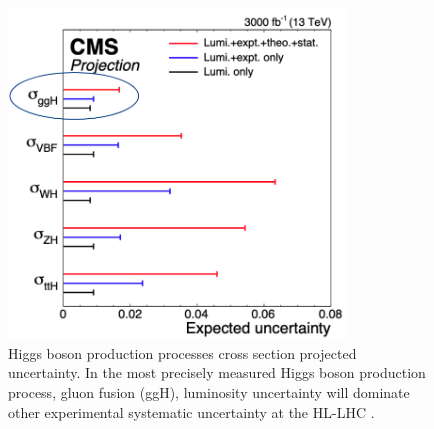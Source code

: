 
\begin{figure}[!htp]
\centering
\includegraphics[width=0.8\textwidth]{ashish_thesis/lumi_precision.png}
\caption[Phase 2 uncertainty projection]{ %
   Higgs boson production processes cross section projected uncertainty. In the most precisely measured Higgs boson production process, gluon fusion (ggH), luminosity uncertainty will dominate other experimental systematic uncertainty at the HL-LHC \cite{Dainese:2703572}.
}
\label{fig:lum_unc}
\end{figure}

